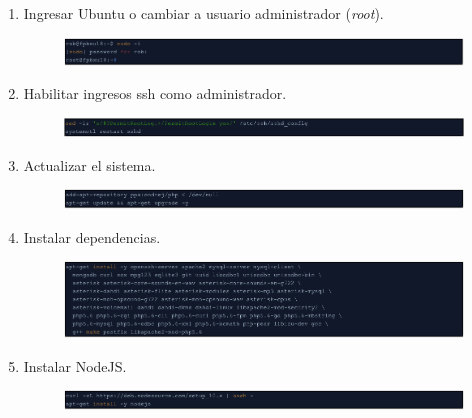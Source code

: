\documentclass{article}
\begin{document}
\begin{enumerate}
  \item Ingresar Ubuntu o cambiar a usuario administrador (\emph{root}).
  \begin{figure}[!h]
    \centering
      \includegraphics[width=\columnwidth]{images/pbx-1.png}
    \label{fig:graph}
  \end{figure}
  
  \item Habilitar ingresos ssh como administrador.
  \begin{figure}[!h]
    \centering
      \includegraphics[width=\columnwidth]{images/pbx-2.png}
    \label{fig:graph}
  \end{figure}
  
  \item Actualizar el sistema.
  \begin{figure}[!h]
    \centering
      \includegraphics[width=\columnwidth]{images/pbx-3.png}
    \label{fig:graph}
  \end{figure}
  
  \item Instalar dependencias.
  \begin{figure}[!h]
    \centering
      \includegraphics[width=\columnwidth]{images/pbx-4.png}
    \label{fig:graph}
  \end{figure}
  
  \item Instalar NodeJS.
  \begin{figure}[!h]
    \centering
      \includegraphics[width=\columnwidth]{images/pbx-5.png}
    \label{fig:graph}
  \end{figure}
  

\end{enumerate}
\end{document}
